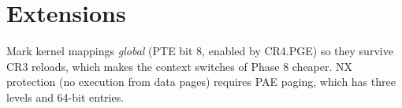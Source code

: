 \documentclass[11pt,a4paper]{article}
\begin{document}
\section{Extensions}

Mark kernel mappings \emph{global} (PTE bit 8, enabled by CR4.PGE) so they survive CR3 reloads, which makes the context switches of Phase 8
cheaper. NX protection (no execution from data pages) requires PAE paging, which has three levels and
64-bit entries.

\booklegend
\end{document}
